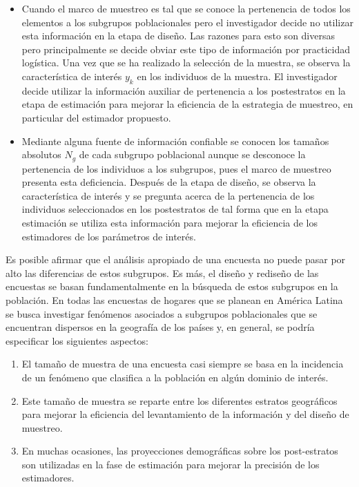 \documentclass[
  12pt,
]{book}
\providecommand{\tightlist}{%
  \setlength{\itemsep}{0pt}\setlength{\parskip}{0pt}}
\begin{document}
\begin{itemize}
  \begin{itemize}
  \tightlist
  \item
    Cuando el marco de muestreo es tal que se conoce la pertenencia de todos los elementos a los subgrupos poblacionales pero el investigador decide no utilizar esta información en la etapa de diseño. Las razones para esto son diversas pero principalmente se decide obviar este tipo de información por practicidad logística. Una vez que se ha realizado la selección de la muestra, se observa la característica de interés \(y_k\) en los individuos de la muestra. El investigador decide utilizar la información auxiliar de pertenencia a los postestratos en la etapa de estimación para mejorar la eficiencia de la estrategia de muestreo, en particular del estimador propuesto.
  \item
    Mediante alguna fuente de información confiable se conocen los tamaños absolutos \(N_g\) de cada subgrupo poblacional aunque se desconoce la pertenencia de los individuos a los subgrupos, pues el marco de muestreo presenta esta deficiencia. Después de la etapa de diseño, se observa la característica de interés y se pregunta acerca de la pertenencia de los individuos seleccionados en los postestratos de tal forma que en la etapa estimación se utiliza esta información para mejorar la eficiencia de los estimadores de los parámetros de interés.
  \end{itemize}
\end{itemize}

Es posible afirmar que el análisis apropiado de una encuesta no puede pasar por alto las diferencias de estos subgrupos. Es más, el diseño y rediseño de las encuestas se basan fundamentalmente en la búsqueda de estos subgrupos en la población. En todas las encuestas de hogares que se planean en América Latina se busca investigar fenómenos asociados a subgrupos poblacionales que se encuentran dispersos en la geografía de los países y, en general, se podría especificar los siguientes aspectos:

\begin{enumerate}
\def\labelenumi{\arabic{enumi}.}
\tightlist
\item
  El tamaño de muestra de una encuesta casi siempre se basa en la incidencia de un fenómeno que clasifica a la población en algún dominio de interés.
\item
  Este tamaño de muestra se reparte entre los diferentes estratos geográficos para mejorar la eficiencia del levantamiento de la información y del diseño de muestreo.
\item
  En muchas ocasiones, las proyecciones demográficas sobre los post-estratos son utilizadas en la fase de estimación para mejorar la precisión de los estimadores.
\end{enumerate}
\end{document}
